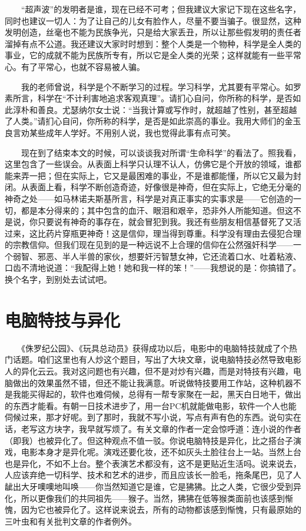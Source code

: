 　　“超声波”的发明者是谁，现在已经不可考；但我建议大家记下现在这些名字，同时也建议一切人：为了让自己的儿女有脸作人，尽量不要当骗子。很显然，这种发明创造，丝毫也不能为民族争光，只是给大家丢丑，所以让那些假发明的责任者溜掉有点不公道。我还建议大家时时想到：整个人类是一个物种，科学是全人类的事业，它的成就不能为民族所专有，所以它是全人类的光荣；这样就能有一些平常心。有了平常心，也就不容易被人骗。 

　　我的老师曾说，科学是个不断学习的过程。学习科学，尤其要有平常心。如罗素所言，科学在“不计利害地追求客观真理”。请扪心自问，你所称的科学，是否如此淳朴和善良。尤瑟纳尔女士说：“当我计算或写作时，就超越了性别，甚至超越了人类。”请扪心自问，你所称的科学，是否是如此崇高的事业。我用大师们的金玉良言劝某些成年人学好。不用别人说，我也觉得此事有点可笑。 

　　现在到了结束本文的时候，可以谈谈我对所谓“生命科学”的看法了。照我看，这里包含了一些误会。从表面上科学只认理不认人，仿佛它是个开放的领域，谁都能来弄一把；但在实际上，它又是最困难的事业，不是谁都能懂，所以它又最为封闭。从表面上看，科学不断创造奇迹，好像很是神奇，但在实际上，它绝无分毫的神奇之处——如马林诺夫斯基所言，科学是对真正事实的实事求是——它创造的一切，都是本分得来的；其中包含的血汗、眼泪和艰辛，恐非外人所能知道。但这不是说，你只要说有神奇的事存在，就会冒犯到我。我还有些朋友相信基督死了又活过来，这比药片穿瓶更神奇！这是信仰，理当得到尊重。科学没有理由去侵犯合理的宗教信仰。但我们现在见到的是一种远说不上合理的信仰在公然强奸科学——一个弱智、邪恶、半人半兽的家伙，想要奸污智慧女神，它还流着口水、吐着粘液、口齿不清地说道：“我配得上她！她和我一样的笨！”——我想说的是：你搞错了。换个名字，到别处去试试吧。

\chapter{电脑特技与异化}

　　《侏罗纪公园》、《玩具总动员》获得成功以后，电影中的电脑特技就成了个热门话题。咱们这里也有人炒这个题目，写出了大块文章，说电脑特技必然导致电影人的异化云云。我对这问题也有兴趣，但不是对炒有兴趣，而是对特技有兴趣，电脑做出的效果虽然不错，但还不能让我满意。听说做特技要用工作站，这种机器不是我能买得起的，软件也难伺候，总得有一帮专家聚在一起，黑天白日地干，做出的东西才能看。有朝一日技术进步了，用一台PC机就能做电影，软件一个人也能伺候过来，那才好呢。到了那时，我就不写小说，写点有声有色的东西。说句实在话，老写这方块字，我早就写烦了。有关文章的作者一定会惊呼道：连小说的作者（即我）也被异化了。但这种观点不值一驳。你说电脑特技是异化，比之搭台子演戏，电影本身才是异化呢。演戏还要化妆，还不如灰头土脸往台上一站。当然上台也是异化，不如不上台。整个表演艺术都没有，这不是更贴近生活吗。说来说去，人应该弃绝一切科学、技术和艺术的进步，而且应该长一脸毛，拖条尾巴，见了人龇出大牙噢噢地叫唤——你当然知道它是谁，它是狒狒。比之人类，它很少受到异化，所以更像我们的共同祖先——猴子。当然，狒狒在低等猴类面前也该感到惭愧，因为它也被异化了。这样说来说去，所有的动物都该感到惭愧，只有最原始的三叶虫和有关批判文章的作者例外。 

